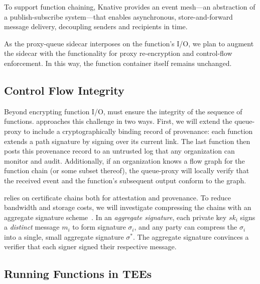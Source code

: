 To support function chaining, Knative provides an event mesh---an abstraction
of a publish-subscribe system---that enables asynchronous, store-and-forward
message delivery, decoupling senders and recipients in time.


%
As the proxy-queue sidecar interposes on the function's I/O, we plan to augment
the sidecar with the functionality for proxy re-encryption and control-flow
enforcement.
%
In this way, the function container itself remains unchanged.




\subsection{Control Flow Integrity}
%
Beyond encrypting function I/O, \SystemName must ensure the integrity
of the sequence of functions.
%
\SystemName approaches this challenge in two ways.
%
First, we will extend the queue-proxy to include a cryptographically binding record
of provenance: each function extends a path signature by signing over its
current link.
%
The last function then posts this provenance record to an untrusted log that
any organization can monitor and audit.
%
Additionally, if an organization knows a flow graph for the function chain (or
some subset thereof),  the queue-proxy will locally verify that the received
event and the function's subsequent output conform to the graph.


\SystemName relies on certificate chains both for attestation and provenance.
%
To reduce bandwidth and storage costs, we will investigate compressing the chains
with an aggregate signature
scheme~\cite{03-eurocrypt-aggregate_signatures_bilinear_maps}.
%
In an \emph{aggregate signature}, each private key $sk_i$ signs a
\emph{distinct} message $m_i$ to form signature $\sigma_i$, and any party can
compress the $\sigma_i$ into a single, small aggregate signature $\sigma^*$.  
%
The aggregate signature convinces a verifier that each signer signed their
respective message.



\subsection{Running Functions in TEEs}

